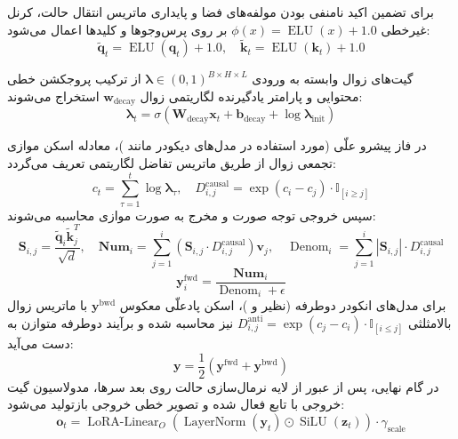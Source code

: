 برای تضمین اکید نامنفی بودن مولفه‌های فضا و پایداری ماتریس انتقال حالت، کرنل غیرخطی $\phi(x) = \operatorname{ELU}(x) + 1.0$ بر روی پرس‌وجوها و کلیدها اعمال می‌شود:
\begin{equation}
\tilde{\mathbf{q}}_t = \operatorname{ELU}(\mathbf{q}_t) + 1.0, \quad \tilde{\mathbf{k}}_t = \operatorname{ELU}(\mathbf{k}_t) + 1.0
\end{equation}

گیت‌های زوال وابسته به ورودی $\boldsymbol{\lambda} \in (0, 1)^{B \times H \times L}$ از ترکیب پروجکشن خطی محتوایی و پارامتر یادگیرنده لگاریتمی زوال $\mathbf{w}_{\text{decay}}$ استخراج می‌شوند:
\begin{equation}
\boldsymbol{\lambda}_t = \sigma\left(\mathbf{W}_{\text{decay}} \mathbf{x}_t + \mathbf{b}_{\text{decay}} + \log \boldsymbol{\lambda}_{\text{init}}\right)
\end{equation}

در فاز پیشرو علّی (مورد استفاده در مدل‌های دیکودر مانند )، معادله اسکن موازی تجمعی زوال از طریق ماتریس تفاضل لگاریتمی تعریف می‌گردد:
\begin{equation}
c_t = \sum_{\tau=1}^t \log \boldsymbol{\lambda}_\tau, \quad D_{i, j}^{\text{causal}} = \exp\left(c_i - c_j\right) \cdot \mathbb{I}_{[i \ge j]}
\end{equation}
سپس خروجی توجه صورت و مخرج به صورت موازی محاسبه می‌شوند:
\begin{equation}
\mathbf{S}_{i, j} = \frac{\tilde{\mathbf{q}}_i \tilde{\mathbf{k}}_j^T}{\sqrt{d}}, \quad
\mathbf{Num}_i = \sum_{j=1}^i \left(\mathbf{S}_{i, j} \cdot D_{i, j}^{\text{causal}}\right) \mathbf{v}_j, \quad
\operatorname{Denom}_i = \sum_{j=1}^i |\mathbf{S}_{i, j}| \cdot D_{i, j}^{\text{causal}}
\end{equation}
\begin{equation}
\mathbf{y}_i^{\text{fwd}} = \frac{\mathbf{Num}_i}{\operatorname{Denom}_i + \epsilon}
\end{equation}
برای مدل‌های انکودر دوطرفه (نظیر  و )، اسکن پادعلّی معکوس $\mathbf{y}^{\text{bwd}}$ با ماتریس زوال بالامثلثی $D_{i, j}^{\text{anti}} = \exp(c_j - c_i) \cdot \mathbb{I}_{[i \le j]}$ نیز محاسبه شده و برآیند دوطرفه متوازن به دست می‌آید:
\begin{equation}
\mathbf{y} = \frac{1}{2} \left(\mathbf{y}^{\text{fwd}} + \mathbf{y}^{\text{bwd}}\right)
\end{equation}
در گام نهایی، پس از عبور از لایه نرمال‌سازی حالت  روی بعد سرها، مدولاسیون گیت خروجی با تابع  فعال شده و تصویر خطی خروجی بازتولید می‌شود:
\begin{equation}
\mathbf{o}_t = \operatorname{LoRA-Linear}_O\left( \operatorname{LayerNorm}(\mathbf{y}_t) \odot \operatorname{SiLU}(\mathbf{z}_t) \right) \cdot \gamma_{\text{scale}}
\end{equation}

